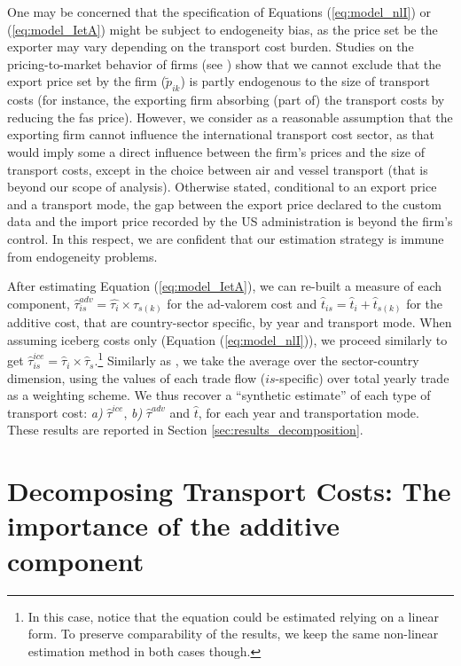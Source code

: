 \documentclass[a4paper,11pt]{article}
\begin{document}
One may be concerned that the specification of Equations (\ref{eq:model_nlI}) or (\ref{eq:model_IetA}) might be subject to endogeneity bias, as the price set be the exporter may vary depending on the transport cost burden. Studies on the pricing-to-market behavior of firms (see \citealp{Krugman-87}) show that we cannot exclude that the export price set by the firm ($\widetilde{p}_{ik}$) is partly endogenous to the size of transport costs (for instance, the exporting firm absorbing (part of) the transport costs by reducing the fas price). However, we consider as a reasonable assumption that the exporting firm cannot influence the international transport cost sector, as that would imply some a direct influence between the firm's prices and the size of transport costs, except in the choice between air and vessel transport (that is beyond our scope of analysis). Otherwise stated, conditional to an export price and a transport mode, the gap between the export price declared to the custom data and the import price recorded by the US administration is beyond the firm's control. In this respect, we are confident that our estimation strategy is immune from endogeneity problems. \smallskip


After estimating Equation (\ref{eq:model_IetA}), we can re-built a measure of each component, $\widehat{\tau}^{adv}_{is} = \widehat{\tau_{i}} \times \widehat{\tau}_{s(k)}$ for the ad-valorem cost and $\widehat{t}_{is} = \widehat{t}_{i} + \widehat{t}_{s(k)}$ for the additive cost, that are country-sector specific, by year and transport mode. When assuming iceberg costs only (Equation (\ref{eq:model_nlI})), we proceed similarly to get $\widehat{\tau}^{ice}_{is} = \widehat{\tau}_{i} \times \widehat{\tau}_{s}$.\footnote{In this case, notice that the equation could be estimated relying on a linear form. To preserve comparability of the results, we keep the same non-linear estimation method in both cases though.} Similarly as \citet{Irrazabal_2015}, we take the average over the sector-country dimension, using the values of each trade flow ($is$-specific) over total yearly trade as a weighting scheme. We thus recover a ``synthetic estimate'' of each type of transport cost: \textit{a)} $\widehat{\tau}^{ice}$, \textit{b)} $\widehat{\tau}^{adv}$ and $\widehat{t}$, for each year and transportation mode. These results are reported in Section \ref{sec:results_decomposition}.


\section{Decomposing Transport Costs: The importance of the additive component \label{sec:results_decomposition}}
\end{document}
